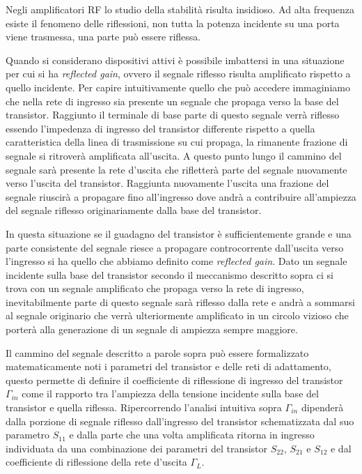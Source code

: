 \documentclass[12pt,oneside]{book}
\begin{document}
Negli amplificatori RF lo studio della stabilità risulta insidioso. Ad alta frequenza esiste il fenomeno delle riflessioni, non tutta la potenza incidente su una porta viene trasmessa, una parte può essere riflessa. 

Quando si considerano dispositivi attivi è possibile imbattersi in una situazione per cui si ha \textit{reflected gain}, ovvero il segnale riflesso risulta amplificato rispetto a quello incidente. Per capire intuitivamente quello che può accedere immaginiamo che nella rete di ingresso sia presente un segnale che propaga verso la base del transistor. Raggiunto il terminale di base parte di questo segnale verrà riflesso essendo l'impedenza di ingresso del transistor differente rispetto a quella caratteristica della linea di trasmissione su cui propaga, la rimanente frazione di segnale si ritroverà amplificata all'uscita. A questo punto lungo il cammino del segnale sarà presente la rete d'uscita che rifletterà parte del segnale nuovamente verso l'uscita del transistor. Raggiunta nuovamente l'uscita una frazione del segnale riuscirà a propagare fino all'ingresso dove andrà a contribuire all'ampiezza del segnale riflesso originariamente dalla base del transistor.

In questa situazione se il guadagno del transistor è sufficientemente grande e una parte consistente del segnale riesce a propagare controcorrente dall'uscita verso l'ingresso si ha quello che abbiamo definito come \textit{reflected gain}. Dato un segnale incidente sulla base del transistor secondo il meccanismo descritto sopra ci si trova con un segnale amplificato che propaga verso la rete di ingresso, inevitabilmente parte di questo segnale sarà riflesso dalla rete e andrà a sommarsi al segnale originario che verrà ulteriormente amplificato in un circolo vizioso che porterà alla generazione di un segnale di ampiezza sempre maggiore.

Il cammino del segnale descritto a parole sopra può essere formalizzato matematicamente noti i parametri del transistor e delle reti di adattamento, questo permette di definire il coefficiente di riflessione di ingresso del transistor $\Gamma_{in}$ come il rapporto tra l'ampiezza della tensione incidente sulla base del transistor e quella riflessa. Ripercorrendo l'analisi intuitiva sopra $\Gamma_{in}$ dipenderà dalla porzione di segnale riflesso dall'ingresso del transistor schematizzata dal suo parametro $S_{11}$ e dalla parte che una volta amplificata ritorna in ingresso individuata da una combinazione dei parametri del transistor $S_{22}$, $S_{21}$ e $S_{12}$ e dal coefficiente di riflessione della rete d'uscita $\Gamma_{L}$.
\end{document}
